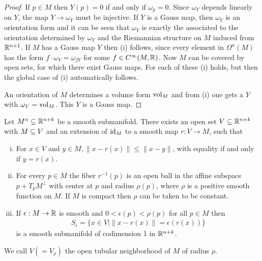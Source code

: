 \begin{proof}
  If $p\in M$ then $Y(p) = 0$ if and only if $\omega_p = 0$. Since $\omega_Y$ depends linearly
  on $Y$, the map $Y\to\omega_Y$ must be injective. If $Y$ is a Gauss map, then $\omega_Y$ is an
  orientation form and it can be seen that $\omega_Y$ is exactly the  associated
  to the orientation determined by $\omega_Y$ and the Riemannian structure on $M$ induced
  from $\mathbb{R}^{n+1}$. If $M$ has a Gauss map $Y$ then (i) follows, since every element in
  $\Omega^n(M)$ has the form $f\cdot\omega_Y = \omega_{fY}$ for some $f\in C^\infty(M, \mathbb{R})$. 
  Now $M$ can be covered by open sets, for which there exist Gauss maps. For each of these (i)
  holds, but then the global case of (i) automatically follows.

  An orientation of $M$ determines a volume form $\mathrm{vol}_M$ and from (i) one gets a $Y$
  with $\omega_Y = \mathrm{vol}_M$. This $Y$ is a Gauss map.  
\end{proof}

\begin{theorem}\label{theorem:9-23}
  Let $M^n\subseteq \mathbb{R}^{n+k}$ be a smooth submanifold. There exists an open set $V\subseteq \mathbb{R}^{n+k}$ with 
  $M\subseteq V$ and an extension of $\operatorname{id}_M$ to a smooth map $r:V\to M$, such that 
  \begin{enumerate}[(i)]
    \item For $x\in V$ and $y\in M, \|x-r(x)\|\le \|x-y\|$, with equality if and only if 
      $y=r(x)$.
    \item For every $p\in M$ the fiber $r^{-1}(p)$ is an open ball in the affine subspace 
      $p + T_pM^\perp$ with center at $p$ and radius $\rho(p)$, where $\rho$ is a positive 
      smooth function on $M$. If $M$ is compact then $\rho$ can be taken to be constant.
    \item If $\epsilon:M\to\mathbb{R}$ is smooth and $0<\epsilon(p)<\rho(p)$ for all $p\in M$ then 
      \begin{align*}
        S_\epsilon = \{x\in V \big| \|x-r(x)\| = \epsilon(r(x)) \}
      \end{align*}
      is a smooth submanifold of codimension 1 in $\mathbb{R}^{n+k}$.
  \end{enumerate}
  We call $V(=V_\rho)$ the open tubular neighborhood of $M$ of radius $\rho$.
\end{theorem}

